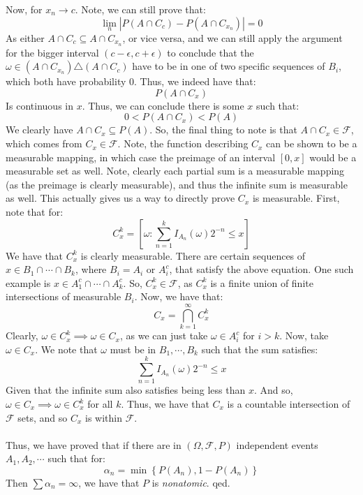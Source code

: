 \documentclass[12pt,a4paper]{article}
\newcommand{\1}[1]{\mathbbm{1}\left\{ #1 \right\}}
\newcommand{\fcal}{\mathcal{F}}
\begin{document}
Now, for $x_n \to c$. Note, we can still prove that:
$$
	\lim_n |P(A \cap C_c) - P(A \cap C_{x_n})| = 0
$$
As either $A \cap C_c \subseteq A \cap C_{x_n}$, or vice versa, and we can still apply the argument for the bigger interval $(c-\epsilon,c+\epsilon)$ to conclude that the $\omega \in (A \cap C_{x_n}) \triangle (A \cap C_c)$ have to be in one of two specific sequences of $B_i$, which both have probability $0$. Thus, we indeed have that:
$$
	P(A \cap C_x)
$$
Is continuous in $x$. Thus, we can conclude there is some $x$ such that:
$$
	0 < P(A \cap C_x) < P(A)
$$
We clearly have $A \cap C_x \subseteq P(A)$. So, the final thing to note is that $A \cap C_x \in \fcal$, which comes from $C_x \in \fcal$. Note, the function describing $C_x$ can be shown to be a measurable mapping, in which case the preimage of an interval $[0,x]$ would be a measurable set as well. Note, clearly each partial sum is a measurable mapping (as the preimage is clearly measurable), and thus the infinite sum is measurable as well. This actually gives us a way to directly prove $C_x$ is measurable. First, note that for:
$$
	C^k_x = \left[\omega: \sum_{n=1}^k I_{A_n}(\omega) 2^{-n} \leq x\right]
$$
We have that $C^k_x$ is clearly measurable. There are certain sequences of $x \in B_1 \cap \cdots \cap B_k$, where $B_i = A_i$ or $A_i^c$, that satisfy the above equation. One such example is $x \in A_1^c \cap \cdots \cap A_k^c$. So, $C^k_x \in \fcal$, as $C^k_x$ is a finite union of finite intersections of measurable $B_i$. Now, we have that:
$$
	C_x = \bigcap_{k=1}^\infty C^k_x
$$
Clearly, $\omega \in C^k_x \implies \omega \in C_x$, as we can just take $\omega \in A_i^c$ for $i > k$. Now, take $\omega \in C_x$. We note that $\omega$ must be in $B_1, \cdots, B_k$ such that the sum satisfies:
$$
	\sum_{n=1}^k I_{A_n}(\omega) 2^{-n} \leq x
$$
Given that the infinite sum also satisfies being less than $x$. And so, $\omega \in C_x \implies \omega \in C^k_x$ for all $k$. Thus, we have that $C_x$ is a countable intersection of $\fcal$ sets, and so $C_x$ is within $\fcal$.
\\\\
Thus, we have proved that if there are in $(\Omega, \fcal, P)$ independent events $A_1, A_2, \cdots$ such that for:
$$
	\alpha_n = \min\left\{P(A_n), 1 - P(A_n)\right\}
$$
Then $\sum \alpha_n = \infty$, we have that $P$ is \textit{nonatomic}. qed.
\end{document}
